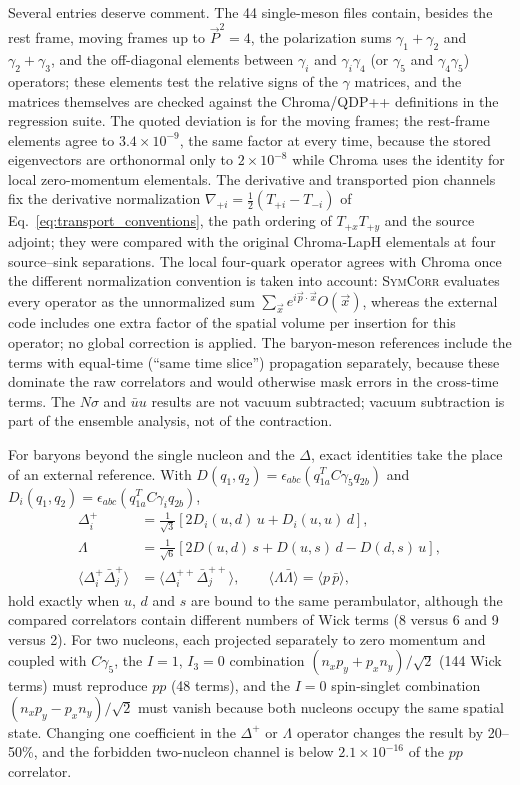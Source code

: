\documentclass[a4paper,fleqn]{cas-dc}
\newcommand{\add}[1]{{\color{blue}#1}}
\begin{document}
Several entries deserve comment. \add{The 44 single-meson files contain, besides the rest frame, moving frames up to \(\vec P^2=4\), the polarization sums \(\gamma_1+\gamma_2\) and \(\gamma_2+\gamma_3\), and the off-diagonal elements between \(\gamma_i\) and \(\gamma_i\gamma_4\) (or \(\gamma_5\) and \(\gamma_4\gamma_5\)) operators; these elements test the relative signs of the \(\gamma\) matrices, and the matrices themselves are checked against the Chroma/QDP++ definitions in the regression suite. The quoted deviation is for the moving frames; the rest-frame elements agree to \(3.4\times10^{-9}\), the same factor at every time, because the stored eigenvectors are orthonormal only to \(2\times10^{-8}\) while Chroma uses the identity for local zero-momentum elementals.} The derivative and transported pion channels
fix the derivative normalization \(\nabla_{+i}=\tfrac12(T_{+i}-T_{-i})\) of
Eq.~\eqref{eq:transport_conventions}, the path ordering of \(T_{+x}T_{+y}\) and the
source adjoint; they were compared with the
original Chroma-LapH elementals at four source--sink separations. The local
four-quark operator agrees with Chroma once the different normalization
convention is taken into account: \textsc{SymCorr} evaluates every operator as the
unnormalized sum \(\sum_{\vec x}e^{i\vec p\cdot\vec x}O(\vec x)\), whereas the
external code includes one extra factor of the spatial volume per insertion for
this operator; no global correction is applied. The baryon-meson references
include the terms with equal-time (``same time slice'') propagation separately,
because these dominate the raw correlators and would otherwise mask errors in the
cross-time terms. The \(N\sigma\) and \(\bar uu\) results are not vacuum
subtracted; vacuum subtraction is part of the ensemble analysis, not of the
contraction.

For baryons beyond the single nucleon and the \(\Delta\), exact identities take
the place of an external reference. With
\(D(q_1,q_2)=\epsilon_{abc}(q_{1a}^TC\gamma_5q_{2b})\) and
\(D_i(q_1,q_2)=\epsilon_{abc}(q_{1a}^TC\gamma_iq_{2b})\),
\begin{align}
\Delta^+_i &= \tfrac{1}{\sqrt3}\left[2D_i(u,d)\,u + D_i(u,u)\,d\right],\nonumber\\
\Lambda &= \tfrac{1}{\sqrt6}\left[2D(u,d)\,s + D(u,s)\,d - D(d,s)\,u\right],\nonumber\\
\langle \Delta^+_i \bar\Delta^+_j\rangle &= \langle \Delta^{++}_i\bar\Delta^{++}_j\rangle,
\qquad
\langle \Lambda\bar\Lambda\rangle = \langle p\,\bar p\rangle,
\label{eq:baryon_identities}
\end{align}
hold exactly when \(u\), \(d\) and \(s\) are bound to the same perambulator, although the
compared correlators contain different numbers of Wick terms (8 versus 6 and 9
versus 2). For two nucleons, each projected separately to zero momentum and
coupled with \(C\gamma_5\), the \(I=1\), \(I_3=0\) combination
\((n_xp_y+p_xn_y)/\sqrt2\) (144 Wick terms) must reproduce \(pp\) (48 terms), and
the \(I=0\) spin-singlet combination \((n_xp_y-p_xn_y)/\sqrt2\) must vanish
because both nucleons occupy the same spatial state. Changing one coefficient in
the \(\Delta^+\) or \(\Lambda\) operator changes the result by 20--50\%, and the
forbidden two-nucleon channel is below \(2.1\times10^{-16}\) of the \(pp\)
correlator.
\end{document}

